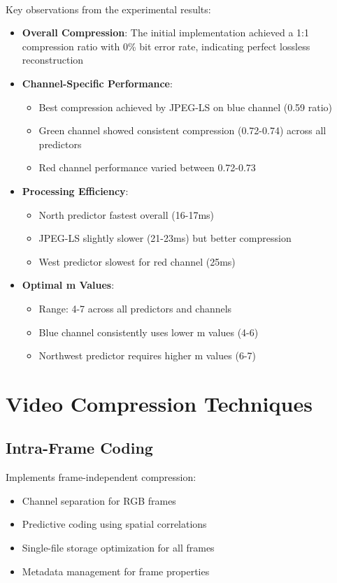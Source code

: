 \documentclass[a4paper,14pt]{article}
\begin{document}
\paragraph{}
Key observations from the experimental results:
\begin{itemize}
    \item \textbf{Overall Compression}: The initial implementation achieved a 1:1 compression ratio with 0\% bit error rate, indicating perfect lossless reconstruction
    
    \item \textbf{Channel-Specific Performance}:
    \begin{itemize}
        \item Best compression achieved by JPEG-LS on blue channel (0.59 ratio)
        \item Green channel showed consistent compression (0.72-0.74) across all predictors
        \item Red channel performance varied between 0.72-0.73
    \end{itemize}
    
    \item \textbf{Processing Efficiency}:
    \begin{itemize}
        \item North predictor fastest overall (16-17ms)
        \item JPEG-LS slightly slower (21-23ms) but better compression
        \item West predictor slowest for red channel (25ms)
    \end{itemize}
    
    \item \textbf{Optimal m Values}:
    \begin{itemize}
        \item Range: 4-7 across all predictors and channels
        \item Blue channel consistently uses lower m values (4-6)
        \item Northwest predictor requires higher m values (6-7)
    \end{itemize}
\end{itemize}

\section{Video Compression Techniques}

\subsection{Intra-Frame Coding}
Implements frame-independent compression:
\begin{itemize}
    \item Channel separation for RGB frames
    \item Predictive coding using spatial correlations
    \item Single-file storage optimization for all frames
    \item Metadata management for frame properties
\end{itemize}
\end{document}
